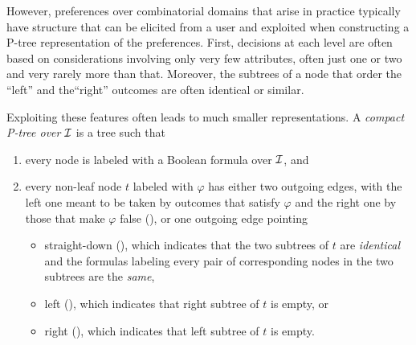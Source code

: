 However, preferences over combinatorial domains that arise in practice
typically have structure that can be elicited from a user and exploited
when constructing a P-tree representation of the preferences. First,
decisions at each level are often based on considerations involving
only very few attributes, often just one or two and very rarely more than that.
Moreover, the subtrees of a node that order the ``left'' and the``right''
outcomes are often identical or similar. 

Exploiting these features often leads to much smaller representations.  
A \emph{compact P-tree over} $\mathcal{I}$ is a tree such that
\begin{enumerate}[itemsep=0pt]
	\item every node is labeled with a Boolean formula over $\mathcal{I}$, and
  \item every non-leaf node $t$ labeled with $\varphi$ has either
        two outgoing edges, with the left one meant to be taken by 
        outcomes that satisfy $\varphi$ and the right one by those that
        make $\varphi$ false (), or one 
    outgoing edge pointing
    \begin{itemize}[itemsep=0pt]
      \item straight-down (), which indicates that the two subtrees of $t$ 
            are \textit{identical} and the formulas
            labeling every pair of corresponding nodes in the two subtrees are the \textit{same},
      \item left (), which indicates that right subtree 
      of $t$ is empty, or
      \item right (), which indicates that left subtree 
      of $t$ is empty.
    \end{itemize}
\end{enumerate}


